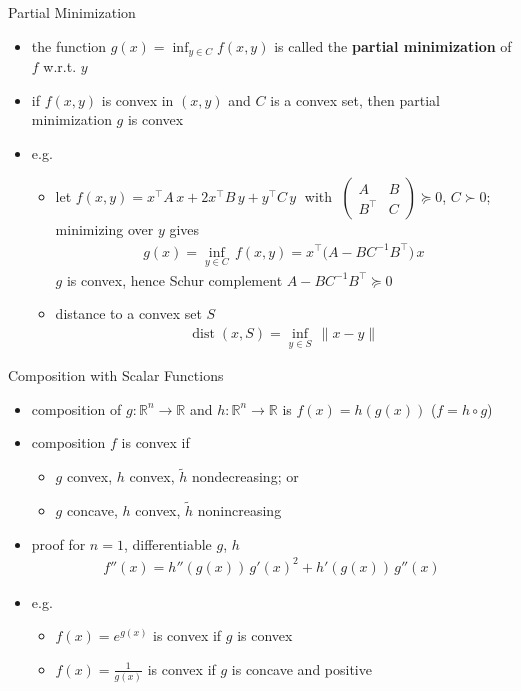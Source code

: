 \documentclass[10pt]{beamer}
\newcommand{\ds}{\displaystyle}
\DeclareMathOperator*{\dist}{dist}
\theoremstyle{definition}
\begin{document}
\begin{frame}{Partial Minimization}
  \begin{itemize}
    \item the function $\ds g(x) = \inf_{y\in C} f(x, y)$ is called the {\bf partial minimization} of $f$ w.r.t. $y$
    \item if $f(x, y)$ is convex in $(x, y)$ and $C$ is a convex set, then partial minimization $g$ is convex
    \item e.g.
      \begin{itemize}
        \item let $f(x, y) = x^\top A\,x + 2 x^\top B\,y + y^\top C\,y\;$ with $\ds\;\begin{pmatrix}A & B \\ B^\top & C\end{pmatrix}\succcurlyeq 0$, $C\succ 0$; minimizing over $y$ gives 
          \begin{align*}
            g(x) = \inf_{y\in C}\,f(x, y) = x^\top\big(A - BC^{-1}B^\top\big)\,x
          \end{align*}
          $g$ is convex, hence Schur complement $A - BC^{-1}B^\top\succcurlyeq 0$
        \item distance to a convex set $S$
          \begin{align*}
            \dist(x, S) = \inf_{y\in S}\,\|x - y\|
          \end{align*}
      \end{itemize}
  \end{itemize}
\end{frame}

\begin{frame}{Composition with Scalar Functions}
  \begin{itemize}
    \item composition of $g:\mathbb{R}^n\to\mathbb{R}$ and $h:\mathbb{R}^n\to\mathbb{R}$ is $\ds f(x) = h(g(x))$ ($\ds f = h\circ g$)
    \item composition $f$ is convex if
      \begin{itemize}
        \item $g$ convex, $h$ convex, $\ds\widetilde{h}$ nondecreasing; or
        \item $g$ concave, $h$ convex, $\ds\widetilde{h}$ nonincreasing
      \end{itemize}
    \item proof for $n = 1$, differentiable $g$, $h$
      \begin{align*}
        f''(x) = h''(g(x))\,g'(x)^2 + h'(g(x))\,g''(x)
      \end{align*}
    \item e.g.
      \begin{itemize}
        \item $f(x) = e^{g(x)}$ is convex if $g$ is convex
        \item $\ds f(x) = \frac{1}{g(x)}$ is convex if $g$ is concave and positive
      \end{itemize}
  \end{itemize}
\end{frame}
\end{document}
